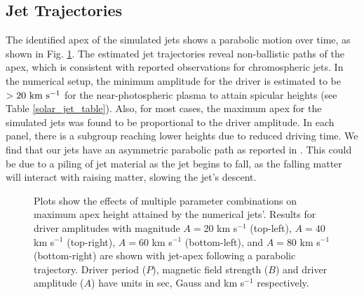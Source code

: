 \subsection{Jet Trajectories}
\label{subsec:jet_traj}
The identified apex of the simulated jets shows a parabolic motion over time, as shown in Fig. \ref{jet_traj}. The estimated jet trajectories reveal non-ballistic paths of the apex, which is consistent with reported observations \citep{Hansteen2006ApJ, Rouppe2007ApJ660L169R, Pontieu2007PASJ} for chromospheric jets. In the numerical setup, the minimum amplitude for the driver is estimated to be $>20 ~\rm{km ~s^{-1}}$ for the near-photospheric plasma to attain spicular heights (see Table \ref{solar_jet_table}). Also, for most cases, the maximum apex for the simulated jets was found to be proportional to the driver amplitude. In each panel, there is a subgroup reaching lower heights due to reduced driving time. We find that our jets have an asymmetric parabolic path as reported in \cite{Singh2019}. This could be due to a piling of jet material as the jet begins to fall, as the falling matter will interact with raising matter, slowing the jet's descent.
\begin{figure}
\captionsetup[subfigure]{labelformat=empty}
\centering
{}
\caption{Plots show the effects of multiple parameter combinations on maximum apex height attained by the numerical jets'. Results for driver amplitudes with magnitude $A = 20$ km s$^{-1}$ (top-left), $A = 40$ km s$^{-1}$ (top-right), $A = 60$ km s$^{-1}$ (bottom-left), and $A = 80$ km s$^{-1}$ (bottom-right) are shown with jet-apex following a parabolic trajectory. Driver period ($P$), magnetic field strength ($B$) and driver amplitude ($A$) have units in sec, Gauss and km s$^{-1}$ respectively. }
\label{jet_traj}
\end{figure}
